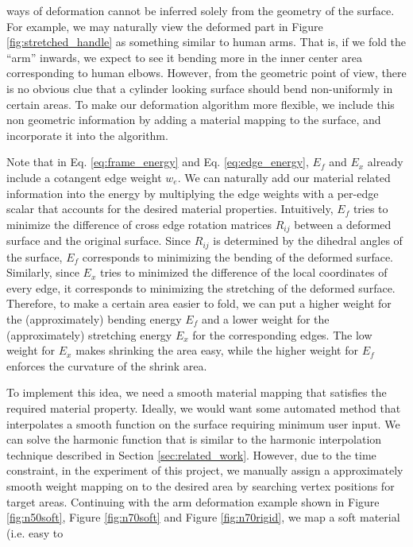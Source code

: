\documentclass{6838publ}
\begin{document}
ways of deformation cannot be inferred solely from the geometry of the
surface. For example, we may naturally view the deformed part in
Figure \ref{fig:stretched_handle} as something similar to human
arms. That is, if we fold the ``arm'' inwards, we expect to see it
bending more in the inner center area corresponding to human
elbows. However, from the geometric point of view, there is no obvious
clue that a cylinder looking surface should bend non-uniformly in
certain areas. To make our deformation algorithm more flexible, we
include this non geometric information by adding a material mapping to
the surface, and incorporate it into the algorithm.
\par Note that in Eq. \ref{eq:frame_energy} and
Eq. \ref{eq:edge_energy}, $E_{f}$ and $E_{x}$ already include a
cotangent edge weight $w_{e}$. We can naturally add our material
related information into the energy by multiplying the edge weights
with a per-edge scalar that accounts for the desired material
properties. Intuitively, $E_{f}$ tries to minimize the difference of
cross edge rotation matrices $R_{ij}$ between a deformed surface and
the original surface. Since $R_{ij}$ is determined by the dihedral
angles of the surface, $E_{f}$ corresponds to minimizing the bending
of the deformed surface. Similarly, since $E_{x}$ tries to minimized
the difference of the local coordinates of every edge, it corresponds
to minimizing the stretching of the deformed surface. Therefore, to
make a certain area easier to fold, we can put a higher weight for the
(approximately) bending energy $E_{f}$ and a lower weight for the
(approximately) stretching energy $E_{x}$ for the corresponding
edges. The low weight for $E_{x}$ makes shrinking the area easy, while
the higher weight for $E_{f}$ enforces the curvature of the shrink
area.
\par To implement this idea, we need a smooth material mapping that
satisfies the required material property. Ideally, we would want some
automated method that interpolates a smooth function on the surface
requiring minimum user input. We can solve the harmonic function that
is similar to the harmonic interpolation technique described in
Section \ref{sec:related_work}.  However, due to the time constraint,
in the experiment of this project, we manually assign a approximately
smooth weight mapping on to the desired area by searching vertex
positions for target areas. Continuing with the arm deformation
example shown in Figure \ref{fig:n50soft}, Figure \ref{fig:n70soft}
and Figure \ref{fig:n70rigid}, we map a soft material (i.e. easy to
\end{document}
